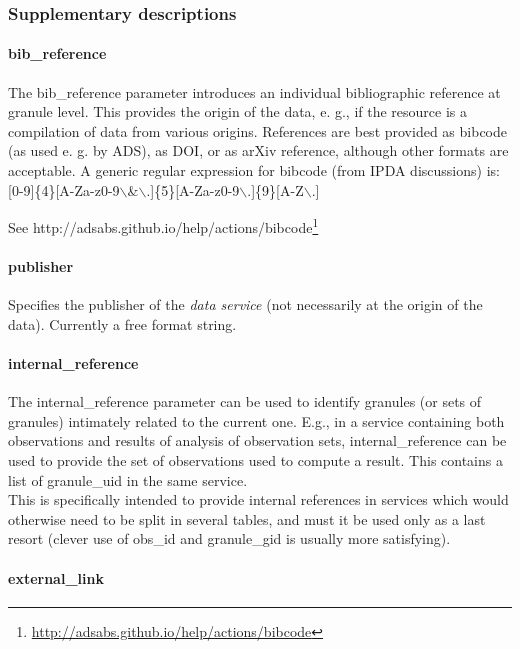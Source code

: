 \documentclass[11pt,a4paper]{ivoa}
\begin{document}
\subsubsection{Supplementary descriptions\\}

\paragraph{bib\_reference}

The bib\_reference parameter introduces an individual bibliographic reference at granule level. This provides the origin of the data, e. g., if the resource is a compilation of data from various origins. References are best provided as bibcode (as used e. g. by ADS), as DOI, or as arXiv reference, although other formats are acceptable. A generic regular expression for bibcode (from IPDA discussions) is: [0-9]\{4\}[A-Za-z0-9$\backslash$\&$\backslash$.]\{5\}[A-Za-z0-9$\backslash$.]\{9\}[A-Z$\backslash$.] 

See http://adsabs.github.io/help/actions/bibcode\footnote{\url{http://adsabs.github.io/help/actions/bibcode}}

\paragraph{publisher}

Specifies the publisher of the \emph{data service} (not necessarily at the origin of the data). Currently a free format string.\\

\paragraph{internal\_reference}

The internal\_reference parameter can be used to identify granules (or sets of granules) intimately related to the current one. E.g., in a service containing both observations and results of analysis of observation sets, internal\_reference can be used to provide the set of observations used to compute a result. This contains a list of granule\_uid in the same service.\\This is specifically intended to provide internal references in services which would otherwise need to be split in several tables, and must it be used only as a last resort (clever use of  obs\_id and granule\_gid is usually more satisfying). 

\paragraph{external\_link}
\end{document}
